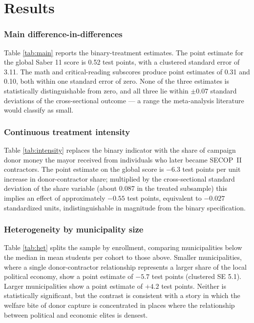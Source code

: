 \documentclass[12pt]{article}
\begin{document}
\section{Results}

\subsubsection*{Main difference-in-differences} Table \ref{tab:main} reports the binary-treatment estimates. The point estimate for the global Saber 11 score is 0.52 test points, with a clustered standard error of 3.11. The math and critical-reading subscores produce point estimates of 0.31 and 0.10, both within one standard error of zero. None of the three estimates is statistically distinguishable from zero, and all three lie within $\pm 0.07$ standard deviations of the cross-sectional outcome --- a range the meta-analysis literature would classify as small.

\begin{table}[h!]
\centering
\caption{Difference-in-differences: donor-contractor mayors and Saber 11 scores}

\label{tab:main}
\end{table}

\subsubsection*{Continuous treatment intensity} Table \ref{tab:intensity} replaces the binary indicator with the share of campaign donor money the mayor received from individuals who later became SECOP~II contractors. The point estimate on the global score is $-6.3$ test points per unit increase in donor-contractor share; multiplied by the cross-sectional standard deviation of the share variable (about 0.087 in the treated subsample) this implies an effect of approximately $-0.55$ test points, equivalent to $-0.027$ standardized units, indistinguishable in magnitude from the binary specification.

\begin{table}[h!]
\centering
\caption{Continuous treatment intensity}

\label{tab:intensity}
\end{table}

\subsubsection*{Heterogeneity by municipality size} Table \ref{tab:het} splits the sample by enrollment, comparing municipalities below the median in mean students per cohort to those above. Smaller municipalities, where a single donor-contractor relationship represents a larger share of the local political economy, show a point estimate of $-5.7$ test points (clustered SE 5.1). Larger municipalities show a point estimate of $+4.2$ test points. Neither is statistically significant, but the contrast is consistent with a story in which the welfare bite of donor capture is concentrated in places where the relationship between political and economic elites is densest.
\end{document}
